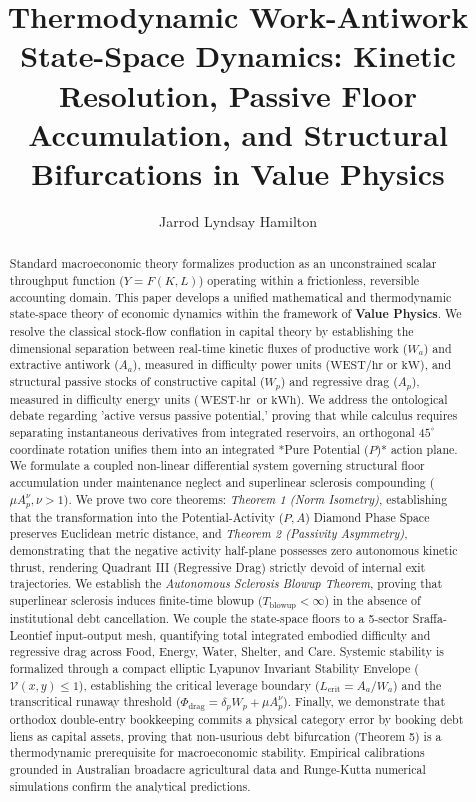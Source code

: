 \documentclass[preprint,12pt,authoryear]{elsarticle}
\theoremstyle{definition}
\begin{document}
\begin{frontmatter}

\title{Thermodynamic Work-Antiwork State-Space Dynamics: Kinetic Resolution, Passive Floor Accumulation, and Structural Bifurcations in Value Physics}

\author{Jarrod Lyndsay Hamilton}
\address{Alethekanon Research Institute --- Division 2: Societal Economics \& Macro-Micro Simulation, Coonabarabran, NSW 2357, Australia}

\begin{abstract}
Standard macroeconomic theory formalizes production as an unconstrained scalar throughput function ($Y = F(K, L)$) operating within a frictionless, reversible accounting domain. This paper develops a unified mathematical and thermodynamic state-space theory of economic dynamics within the framework of \textbf{Value Physics}. We resolve the classical stock-flow conflation in capital theory by establishing the dimensional separation between real-time kinetic fluxes of productive work ($W_a$) and extractive antiwork ($A_a$), measured in difficulty power units ($ \text{WEST/hr}$ or $ \text{kW}$), and structural passive stocks of constructive capital ($W_p$) and regressive drag ($A_p$), measured in difficulty energy units ($ \text{WEST}\cdot \text{hr}$ or $ \text{kWh}$). We address the ontological debate regarding 'active versus passive potential,' proving that while calculus requires separating instantaneous derivatives from integrated reservoirs, an orthogonal $45^\circ$ coordinate rotation unifies them into an integrated *Pure Potential ($P$)* action plane. We formulate a coupled non-linear differential system governing structural floor accumulation under maintenance neglect and superlinear sclerosis compounding ($\mu A_p^\nu,\nu > 1$). We prove two core theorems: \textit{Theorem 1 (Norm Isometry)}, establishing that the transformation into the Potential-Activity ($P, A$) Diamond Phase Space preserves Euclidean metric distance, and \textit{Theorem 2 (Passivity Asymmetry)}, demonstrating that the negative activity half-plane possesses zero autonomous kinetic thrust, rendering Quadrant III (Regressive Drag) strictly devoid of internal exit trajectories. We establish the \textit{Autonomous Sclerosis Blowup Theorem}, proving that superlinear sclerosis induces finite-time blowup ($T_{ \text{blowup}} < \infty$) in the absence of institutional debt cancellation. We couple the state-space floors to a 5-sector Sraffa-Leontief input-output mesh, quantifying total integrated embodied difficulty and regressive drag across Food, Energy, Water, Shelter, and Care. Systemic stability is formalized through a compact elliptic Lyapunov Invariant Stability Envelope ($\mathcal{V}(x, y) \le 1$), establishing the critical leverage boundary ($L_{ \text{crit}} = A_a / W_a$) and the transcritical runaway threshold ($\Phi_{ \text{drag}} = \delta_p W_p + \mu A_p^\nu$). Finally, we demonstrate that orthodox double-entry bookkeeping commits a physical category error by booking debt liens as capital assets, proving that non-usurious debt bifurcation (Theorem 5) is a thermodynamic prerequisite for macroeconomic stability. Empirical calibrations grounded in Australian broadacre agricultural data and Runge-Kutta numerical simulations confirm the analytical predictions.

\end{abstract}
\end{frontmatter}
\end{document}
